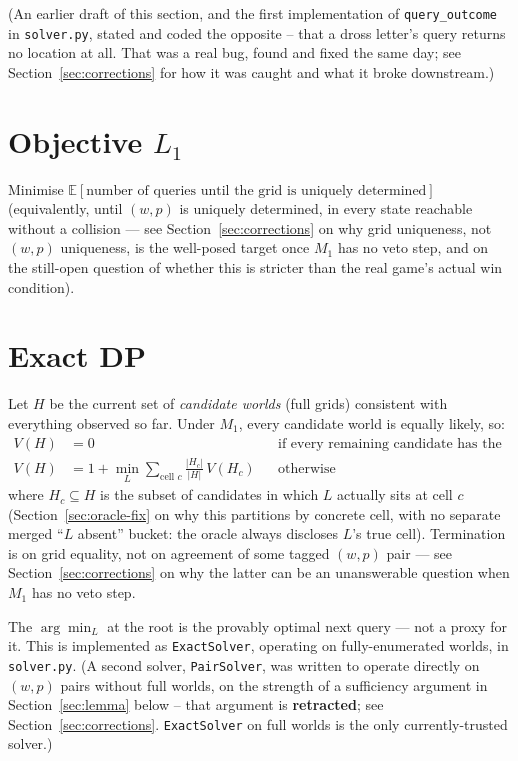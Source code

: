 \documentclass[11pt]{article}
\begin{document}
(An earlier draft of this section, and the first implementation of
\texttt{query\_outcome} in \texttt{solver.py}, stated and coded the
opposite -- that a dross letter's query returns no location at all. That
was a real bug, found and fixed the same day; see
Section~\ref{sec:corrections} for how it was caught and what it broke
downstream.)

\section{Objective $L_1$}

Minimise $\mathbb{E}[\text{number of queries until the grid is uniquely
determined}]$ (equivalently, until $(w,p)$ is uniquely determined, in every
state reachable without a collision --- see Section~\ref{sec:corrections}
on why grid uniqueness, not $(w,p)$ uniqueness, is the well-posed target
once $M_1$ has no veto step, and on the still-open question of whether this
is stricter than the real game's actual win condition).

\section{Exact DP}

Let $H$ be the current set of \emph{candidate worlds} (full grids)
consistent with everything observed so far. Under $M_1$, every candidate
world is equally likely, so:
\begin{align}
V(H) &= 0 &&\text{if every remaining candidate has the same grid} \\
V(H) &= 1 + \min_{L} \sum_{\text{cell } c} \frac{|H_c|}{|H|}\, V(H_c)
&&\text{otherwise}
\end{align}
where $H_c \subseteq H$ is the subset of candidates in which $L$ actually
sits at cell $c$ (Section~\ref{sec:oracle-fix} on why this partitions by
concrete cell, with no separate merged ``$L$ absent'' bucket: the oracle
always discloses $L$'s true cell). Termination is on grid equality, not on
agreement of some tagged $(w,p)$ pair --- see
Section~\ref{sec:corrections} on why the latter can be an unanswerable
question when $M_1$ has no veto step.

The $\arg\min_L$ at the root is the provably optimal next query --- not a
proxy for it. This is implemented as \texttt{ExactSolver}, operating on
fully-enumerated worlds, in \texttt{solver.py}. (A second solver,
\texttt{PairSolver}, was written to operate directly on $(w,p)$ pairs
without full worlds, on the strength of a sufficiency argument in
Section~\ref{sec:lemma} below -- that argument is \textbf{retracted}; see
Section~\ref{sec:corrections}. \texttt{ExactSolver} on full worlds is the
only currently-trusted solver.)
\end{document}
